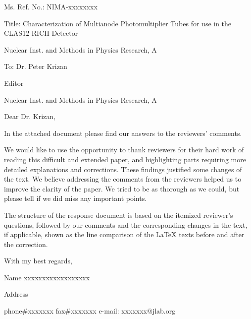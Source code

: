 \documentclass[final,3p,times]{elsarticle}
\begin{document}
Ms. Ref. No.:  NIMA-xxxxxxxx

Title: Characterization of Multianode Photomultiplier Tubes for use in the CLAS12 RICH Detector

Nuclear Inst. and Methods in Physics Research, A
\newline
\newline
\newline

To: Dr. Peter Krizan

Editor

Nuclear Inst. and Methods in Physics Research, A
\newline
\newline
\newline

Dear Dr. Krizan,
\newline

In the attached document please find our answers to the reviewers' comments.

We would like to use the opportunity to thank reviewers for their hard work of reading this difficult and extended paper, and highlighting parts requiring more detailed explanations and corrections. These findings justified some changes of the text. We believe addressing the comments from the reviewers helped us to improve the clarity of the paper. We tried to be as thorough as we could, but please tell if we did miss any important points.

The structure of the response document is based on the itemized reviewer's questions, followed by our comments and the corresponding changes in the text, if applicable, shown as the line comparison of the LaTeX texts before and after the correction. 

\newline

With my best regards,

Name xxxxxxxxxxxxxxxxxx
\newline

Address

phone\#xxxxxxx fax\#xxxxxxx  e-mail: xxxxxxx@jlab.org
\end{document}
